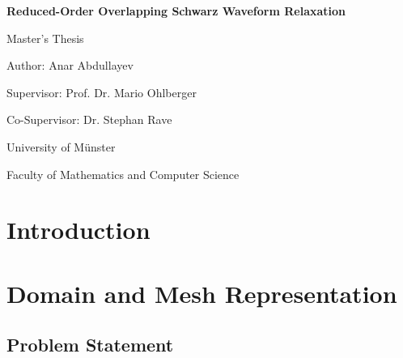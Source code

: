 \documentclass[11pt]{report}
\begin{document}
\begin{titlepage}
\centering

\vspace*{3.5cm}

{\huge\bfseries Reduced-Order Overlapping Schwarz Waveform Relaxation \par}

\vspace{2.5cm}

{\Large Master's Thesis \par}

\vspace{1.5cm}

{\Large Author: Anar Abdullayev \par}

\vspace{0.8cm}

{\Large Supervisor: Prof. Dr. Mario Ohlberger \par}

\vspace{0.3cm}

{\Large Co-Supervisor: Dr. Stephan Rave \par}

\vfill

{\Large University of Münster \par}
\vspace{0.3cm}
{\Large Faculty of Mathematics and Computer Science \par}

\end{titlepage}


\begin{abstract}
Short summary.
\end{abstract}

\tableofcontents

\clearpage
{}
\setcounter{page}{1}

\chapter{Introduction}

\chapter{Domain and Mesh Representation}
\section{Problem Statement}
\end{document}

